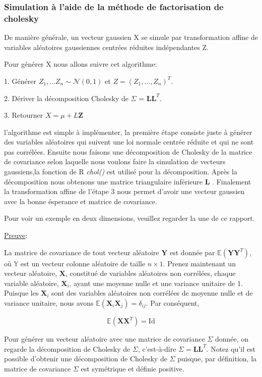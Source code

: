 \documentclass[10pt]{article} %
\begin{document}
 \subsubsection{Simulation à l'aide de la méthode de factorisation de cholesky}

 De manière générale, un vecteur gaussien X se simule par transformation affine de
 variables aléatoires gaussiennes centrées réduites indépendantes Z.

 Pour générer X nous allons suivre cet algorithme:\

 1. Générer $Z_1, ... Z_n \sim \mathcal{N}(0 , 1)$ et $Z = (Z_1,...,Z_n)^T$.

 2. Dériver la décomposition Cholesky de $\Sigma$ = $\textbf{LL}^T$.

 3. Retourner $X = \mu + L\textbf{Z}$


 l'algorithme est simple à implémenter, la première étape consiste juste à générer des variables aléatoires qui suivent une loi normale centrée réduite et qui ne sont pas corrélées. Ensuite nous faisons une décomposition de Cholesky de la matrice de covariance selon laquelle nous voulons faire la simulation de vecteurs gaussiens,la fonction de R {\it chol()} est utilisé pour la décomposition. Après la décomposition nous obtenons une matrice triangulaire inférieure \textbf{L} .
 Finalement la transformation affine de l'étape 3 nous permet d'avoir une vecteur gaussien avec la bonne ésperance et matrice de covariance.

 Pour voir un exemple en deux dimensions, veuillez regarder la une de ce rapport.

 \underline{Preuve}:

 La matrice de covariance de tout vecteur aléatoire $ \textbf{Y} $
 est donnée par $\mathbb{E}(\textbf{YY}^T)$, où $ \mathbb{Y} $ est
 un vecteur colonne aléatoire de taille $n \times 1$. Prenez maintenant un vecteur aléatoire,
 $\textbf{X}$, constitué de variables aléatoires
  non corrélées, chaque variable aléatoire, $\textbf{X}_i$, ayant une moyenne nulle et une variance unitaire de 1. Puisque les $\textbf{X}_i$
  sont des variables aléatoires non corrélées de moyenne nulle et de variance unitaire, nous avons $\mathbb{E}(\textbf{X}_i\textbf{X}_j)= \delta_{ij} $.
  Par conséquent,

$$\mathbb{E}(\textbf{XX}^T) = \text{Id} $$


Pour générer un vecteur aléatoire avec une matrice de covariance $\Sigma$ donnée, on regarde la décomposition de Cholesky de $\Sigma$,
c'est-à-dire $\Sigma =\textbf{LL}^T $. Notez qu'il est possible d'obtenir une décomposition de Cholesky de $\Sigma$ puisque, par définition,
la matrice de covariance $\Sigma $ est symétrique et définie positive.
\end{document}
